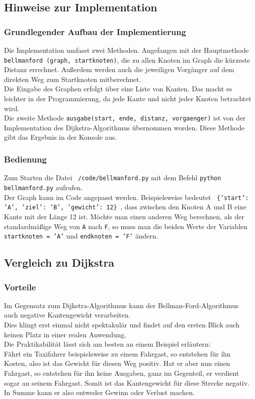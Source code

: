 \documentclass[12pt]{article}
\def\code#1{\texttt{#1}}
\begin{document}
		
	\subsection{Hinweise zur Implementation}
		\subsubsection{Grundlegender Aufbau der Implementierung}
			Die Implementation umfasst zwei Methoden. Angefangen mit der Hauptmethode \code{bellmanford (graph, startknoten)}, die zu allen Knoten im Graph die kürzeste Distanz errechnet. Außerdem werden auch die jeweiligen Vorgänger auf dem direkten Weg zum Startknoten mitberechnet.\\
			Die Eingabe des Graphen erfolgt über eine Liste von Kanten. Das macht es leichter in der Programmierung, da jede Kante und nicht jeder Knoten betrachtet wird.\\
			Die zweite Methode \code{ausgabe(start, ende, distanz, vorgaenger)} ist von der Implementation des Dijkstra-Algorithmus übernommen worden. Diese Methode gibt das Ergebnis in der Konsole aus.
			
		\subsubsection{Bedienung}
			Zum Starten die Datei \code{~/code/bellmanford.py} mit dem Befehl \code{python bellmanford.py} aufrufen.\\
			Der Graph kann im Code angepasst werden. Beispielsweise bedeutet \code{ \{'start': 'A', 'ziel': 'B', 'gewicht': 12\} }, dass zwischen den Knoten A und B eine Kante mit der Länge 12 ist.
			Möchte man einen anderen Weg berechnen, als der standardmäßige Weg von \code{A} nach \code{F}, so muss man die beiden Werte der Variablen \code{startknoten = 'A'} und \code{endknoten = 'F'} ändern.
	
	\subsection{Vergleich zu Dijkstra}
		\subsubsection{Vorteile}
			Im Gegensatz zum Dijkstra-Algorithmus kann der Bellman-Ford-Algorithmus auch negative Kantengewicht verarbeiten.\\
			Dies klingt erst einmal nicht spektakulär und findet auf den ersten Blick auch keinen Platz in einer realen Anwendung.\\
			Die Praktikabilität lässt sich am besten an einem Beispiel erläutern:\\
			Fährt ein Taxifahrer beispielsweise zu einem Fahrgast, so entstehen für ihn Kosten, also ist das Gewicht für diesen Weg positiv. Hat er aber nun einen Fahrgast, so entstehen für ihn keine Ausgaben, ganz im Gegenteil, er verdient sogar an seinem Fahrgast. Somit ist das Kantengewicht für diese Strecke negativ. In Summe kann er also entweder Gewinn oder Verlust machen. \cite{bellmanford}
			
\end{document}
